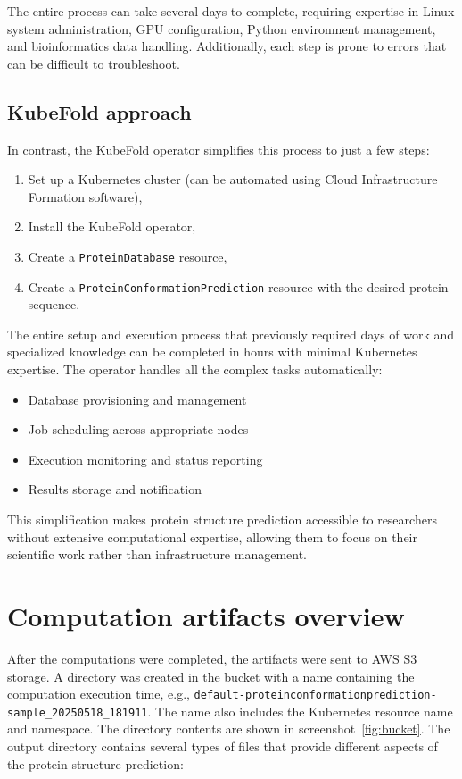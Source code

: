 The entire process can take several days to complete, requiring expertise in Linux system administration, GPU configuration, Python environment management, and bioinformatics data handling.
Additionally, each step is prone to errors that can be difficult to troubleshoot.

\subsection{KubeFold approach}

In contrast, the KubeFold operator simplifies this process to just a few steps:

\begin{enumerate}
    \item Set up a Kubernetes cluster (can be automated using Cloud Infrastructure Formation software),
    \item Install the KubeFold operator,
    \item Create a \texttt{ProteinDatabase} resource,
    \item Create a \texttt{ProteinConformationPrediction} resource with the desired protein sequence.
\end{enumerate}

The entire setup and execution process that previously required days of work and specialized knowledge can be completed in hours with minimal Kubernetes expertise.
The operator handles all the complex tasks automatically:

\begin{itemize}
    \item Database provisioning and management
    \item Job scheduling across appropriate nodes
    \item Execution monitoring and status reporting
    \item Results storage and notification
\end{itemize}

This simplification makes protein structure prediction accessible to researchers without extensive computational expertise, allowing them to focus on their scientific work rather than infrastructure management.

\section{Computation artifacts overview}

After the computations were completed, the artifacts were sent to AWS S3 storage.
A directory was created in the bucket with a name containing the computation execution time, e.g., \texttt{default-proteinconformationprediction-sample\_20250518\_181911}.
The name also includes the Kubernetes resource name and namespace.
The directory contents are shown in screenshot~\ref{fig:bucket}.
The output directory contains several types of files that provide different aspects of the protein structure prediction:

